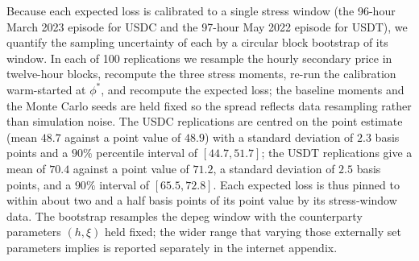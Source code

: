 Because each expected loss is calibrated to a single stress window (the 96-hour March 2023 episode for USDC and the 97-hour May 2022 episode for USDT), we quantify the sampling uncertainty of each by a circular block bootstrap of its window. In each of 100 replications we resample the hourly secondary price in twelve-hour blocks, recompute the three stress moments, re-run the calibration warm-started at $\phi^*$, and recompute the expected loss; the baseline moments and the Monte Carlo seeds are held fixed so the spread reflects data resampling rather than simulation noise. The USDC replications are centred on the point estimate (mean $48.7$ against a point value of $48.9$) with a standard deviation of $2.3$ basis points and a $90\%$ percentile interval of $[44.7, 51.7]$; the USDT replications give a mean of $70.4$ against a point value of $71.2$, a standard deviation of $2.5$ basis points, and a $90\%$ interval of $[65.5, 72.8]$. Each expected loss is thus pinned to within about two and a half basis points of its point value by its stress-window data. The bootstrap resamples the depeg window with the counterparty parameters $(h,\xi)$ held fixed; the wider range that varying those externally set parameters implies is reported separately in the internet appendix.
